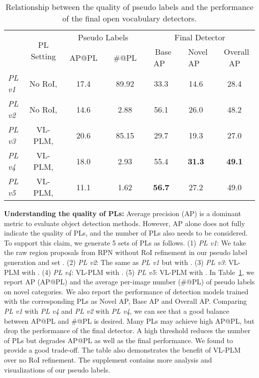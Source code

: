 \documentclass[runningheads]{llncs}
\begin{document}
\begin{table}[tb]
\begin{center}
\caption{Relationship between the quality of pseudo labels and the performance of the final open vocabulary detectors.}
\label{tab:PL_quality_vs_detector}
\begin{tabular}{l|c|cc|c c c}
\toprule
      & \multirow{2}{*}{PL Setting} & \multicolumn{2}{|c}{Pseudo Labels} & \multicolumn{3}{|c}{Final Detector} \\
\cline{3-7}
      &  & \ AP@PL\  & \ \#@PL\  & \ Base AP\  &\  Novel AP\  & \ Overall AP \\
\hline
\emph{PL v1} & No RoI,  & 17.4 & 89.92 & 33.3 & 14.6 & 28.4 \\
\emph{PL v2} & No RoI,  & 14.6 & 2.88 & 56.1 & 26.0 & 48.2 \\
\hline
\emph{PL v3} & VL-PLM,  & 20.6 & 85.15 & 29.7 & 19.3 & 27.0 \\
\emph{PL v4} & VL-PLM,  & 18.0 & {2.93} & 55.4 & \bf{31.3} & \bf{49.1} \\
\emph{PL v5} & VL-PLM,  & 11.1 & 1.62 & \bf{56.7} & 27.2 & 49.0 \\
\bottomrule
\end{tabular}
\end{center}
\end{table}





\vspace{1mm}
\noindent \textbf{Understanding the quality of PLs: } 
Average precision (AP) is a dominant metric to evaluate object detection methods. 
However, AP alone does not fully indicate the quality of PLs, and the number of PLs also needs to be considered.
To support this claim, we generate 5 sets of PLs as follows. 
(1) \emph{PL v1}: We take the raw region proposals from RPN without RoI refinement in our pseudo label generation and set . 
(2) \emph{PL v2}: The same as \emph{PL v1} but with . 
(3) \emph{PL v3}: VL-PLM with . 
(4) \emph{PL v4}: VL-PLM with . 
(5) \emph{PL v5}: VL-PLM with . 
In Table~\ref{tab:PL_quality_vs_detector}, we report AP (AP@PL) and the average per-image number (\#@PL) of pseudo labels on novel categories. We also report the performance of detection models trained with the corresponding PLs as Novel AP, Base AP and Overall AP.
Comparing \emph{PL v1} with \emph{PL v4} and \emph{PL v2} with \emph{PL v4}, we can see that a good balance between AP@PL and \#@PL is desired. Many PLs may achieve high AP@PL, but drop the performance of the final detector. A high threshold reduces the number of PLs but degrades AP@PL as well as the final performance. We found  to provide a good trade-off. The table also demonstrates the benefit of VL-PLM over no RoI refinement. 
The supplement contains more analysis and visualizations of our pseudo labels.
\end{document}
